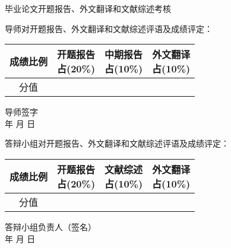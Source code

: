 \thispagestyle{empty}
{
\begin{center}
\stfangsong\sihao 毕业论文开题报告、外文翻译和文献综述考核
\end{center}
}
{\songti\sihao 导师对开题报告、外文翻译和文献综述评语及成绩评定：}
\vspace{4cm}

{
\hspace{3cm} \songti\xiaosi
\begin{tabular}{|c|c|c|c|}
    \hline
    成绩比例 & \parbox[t]{4em}{开题报告\\[-1.5em]占(20\%)} &
               \parbox[t]{4em}{中期报告\\[-1.5em]占(10\%)} &
               \parbox[t]{4em}{外文翻译\\[-1.5em]占(10\%)} \\

    \hline
    分值   & & &  \\
    \hline
\end{tabular}
}
\begin{flushright}
    导师签字\;\underline{\hspace{4em}}\\
    年 \quad 月 \quad 日
\end{flushright}
\vspace{-1cm}
{\songti\sihao 答辩小组对开题报告、外文翻译和文献综述评语及成绩评定：}
\vspace{4cm}

{
\hspace{3cm} \songti\xiaosi
\begin{tabular}{|c|c|c|c|}
    \hline
    成绩比例 & \parbox[t]{4em}{开题报告\\[-1.5em]占(20\%)} &
               \parbox[t]{4em}{文献综述\\[-1.5em]占(10\%)} &
               \parbox[t]{4em}{外文翻译\\[-1.5em]占(10\%)} \\

    \hline
    分值   & & &  \\
    \hline
\end{tabular}
}
\begin{flushright}
    答辩小组负责人（签名）\;\underline{\hspace{4em}}\\
    年 \quad 月 \quad 日
\end{flushright}

